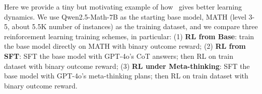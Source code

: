 Here we provide a tiny but motivating example of how \method~gives better learning dynamics. We use Qwen2.5-Math-7B \citep{yang2024qwen25mathtechnicalreportmathematical} as the starting base model, MATH (level 3-5, about 5.5K number of instances) as the training dataset, and we compare three reinforcement learning training schemes, in particular:
(1) \textbf{RL from Base}: train the base model directly on MATH with binary outcome reward;
(2) \textbf{RL from SFT}: SFT the base model with GPT-4o's CoT answers; then RL on train dataset with binary outcome reward;
(3) \textbf{RL under Meta-thinking}: SFT the base model with GPT-4o's meta-thinking plans; then RL on train dataset with binary outcome reward.

